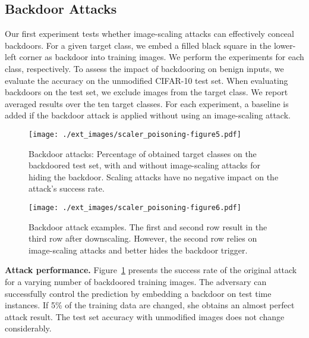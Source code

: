 \documentclass[conference]{IEEEtran}
\renewcommand{\paragraph}[1]{{\vskip 8pt \noindent\bf #1 }}
\begin{document}
\subsection{Backdoor Attacks}
Our first experiment tests whether image-scaling attacks can 
effectively conceal backdoors. For a given target class, we
embed a filled black square in the lower-left corner as backdoor into 
training images. We perform the experiments for each class, 
respectively. To assess the impact of backdooring on benign inputs, we 
evaluate the {accuracy\EndAccSupp{}} on the unmodified CIFAR-10 test set. When 
evaluating backdoors on the test set, we exclude images from the target 
class. We report averaged results over the ten target 
classes. For each experiment, a baseline is added if the backdoor 
attack is applied without using an image-scaling attack.


\begin{figure}
	\centering
	\texttt{[image: ./ext\_images/scaler\_poisoning-figure5.pdf]}
	\vspace{-0.30cm}
	\caption{Backdoor attacks: 
		Percentage of obtained target classes on the 
		backdoored test 
		set, with and without image-scaling attacks for hiding the 
		backdoor. Scaling attacks have no negative impact on the 
		attack's success rate.
}
	\label{fig:eval_backdoor_plain_testtime}
\end{figure}
\begin{figure}
	\centering
	\texttt{[image: ./ext\_images/scaler\_poisoning-figure6.pdf]}
	\vspace{-0.15cm}
	\caption{Backdoor attack examples.
The first and second row result in the third row after downscaling.
However, the second row relies on image-scaling
attacks and better hides the backdoor trigger.
}
	\label{fig:eval_backdoor_plain_testtime_examples}
\end{figure}

\paragraph{Attack performance.}
Figure~\ref{fig:eval_backdoor_plain_testtime} 
presents the success rate of the original attack for a varying number 
of backdoored training images. The adversary can successfully control 
the prediction by embedding a backdoor on test time instances. If 
5\% of the training data are changed, she obtains an almost perfect 
attack result. The test set accuracy with unmodified images does not 
change considerably.
\end{document}
